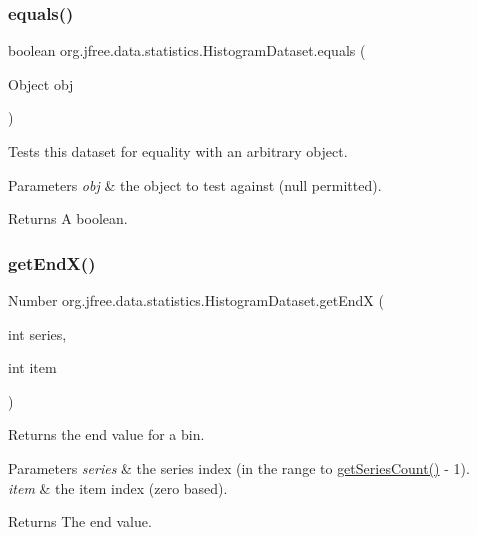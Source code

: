 \subsubsection{\texorpdfstring{equals()}{equals()}}
{\footnotesize\ttfamily boolean org.\+jfree.\+data.\+statistics.\+Histogram\+Dataset.\+equals (\begin{DoxyParamCaption}\item[{Object}]{obj }\end{DoxyParamCaption})}

Tests this dataset for equality with an arbitrary object.


\begin{DoxyParams}{Parameters}
{\em obj} & the object to test against ({\ttfamily null} permitted).\\
\hline
\end{DoxyParams}
\begin{DoxyReturn}{Returns}
A boolean. 
\end{DoxyReturn}
\mbox{\label{classorg_1_1jfree_1_1data_1_1statistics_1_1_histogram_dataset_a573dd7321bd64f58b99f786bd3a9ad34}} 
\subsubsection{\texorpdfstring{get\+End\+X()}{getEndX()}}
{\footnotesize\ttfamily Number org.\+jfree.\+data.\+statistics.\+Histogram\+Dataset.\+get\+EndX (\begin{DoxyParamCaption}\item[{int}]{series,  }\item[{int}]{item }\end{DoxyParamCaption})}

Returns the end value for a bin.


\begin{DoxyParams}{Parameters}
{\em series} & the series index (in the range {} to {\ttfamily \mbox{\hyperlink{classorg_1_1jfree_1_1data_1_1statistics_1_1_histogram_dataset_a6dd14ceca0cb3f9b3d666a2aec480f8d}{get\+Series\+Count()}} -\/ 1}). \\
\hline
{\em item} & the item index (zero based).\\
\hline
\end{DoxyParams}
\begin{DoxyReturn}{Returns}
The end value.
\end{DoxyReturn}


